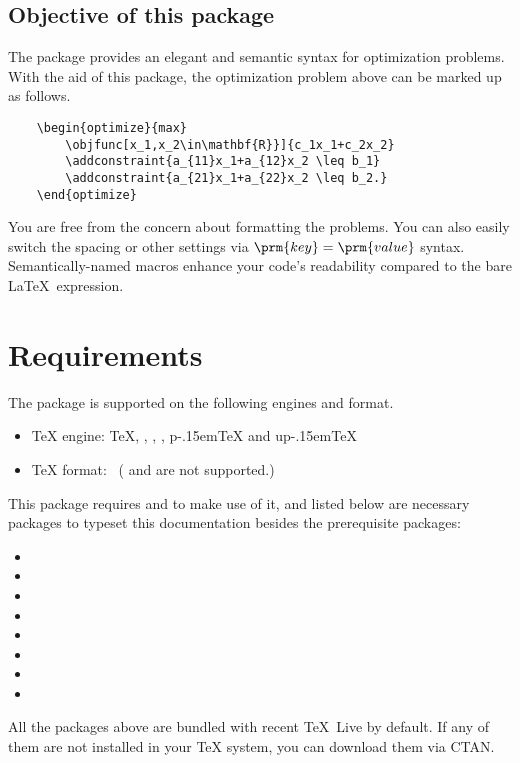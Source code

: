 \documentclass[a4paper,10pt]{article}
\def\pTeX{p\kern-.15em\TeX}
\def\upTeX{up\kern-.15em\TeX}
\begin{document}
\subsection{Objective of this package}
The  package provides an elegant and semantic syntax for optimization problems.
With the aid of this package, the optimization problem above can be marked up as follows.
\begin{verbatim}
    \begin{optimize}{max}
        \objfunc[x_1,x_2\in\mathbf{R}}]{c_1x_1+c_2x_2}
        \addconstraint{a_{11}x_1+a_{12}x_2 \leq b_1}
        \addconstraint{a_{21}x_1+a_{22}x_2 \leq b_2.}
    \end{optimize}
\end{verbatim}

You are free from the concern about formatting the problems.
You can also easily switch the spacing or other settings via $\prm{key} = \prm{value}$ syntax.
Semantically-named macros enhance your code's readability compared to the bare \LaTeX\ expression.

\section{Requirements}
The  package is supported on the following engines and format.
\begin{itemize}
    \item {\TeX} engine: \TeX, , , , {\pTeX} and \upTeX
    \item {\TeX} format: \LaTeXe\ ( and  are not supported.)
\end{itemize}
This package requires  and  to make use of it, and listed below are necessary packages to typeset this documentation besides the prerequisite packages:
\begin{multicols}{4}
\begin{itemize}
    \item {}
    \item {}
    \item {}
    \item {}
    \item {}
    \item {}
    \item {}
    \item {}
\end{itemize}
\end{multicols}
All the packages above are bundled with recent \TeX~Live by default.
If any of them are not installed in your {\TeX} system, you can download them via CTAN.
\end{document}
